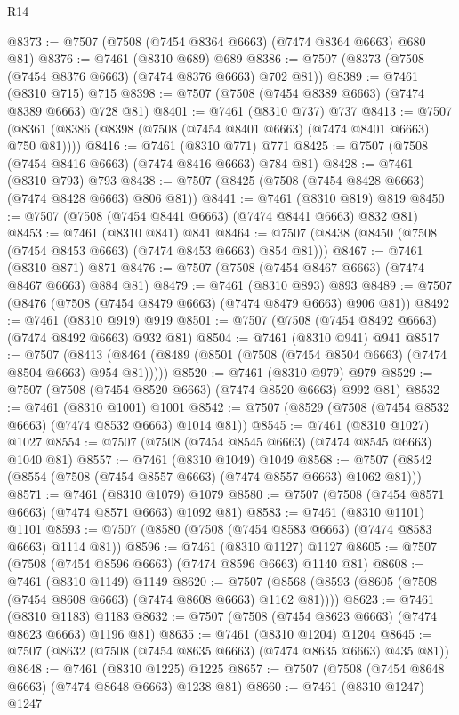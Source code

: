 \begin{lexlean}{R14}
\begin{coremodule}
@8373 := @7507 (@7508 (@7454 @8364 @6663) (@7474 @8364 @6663) @680 @81)
@8376 := @7461 (@8310 @689) @689
@8386 := @7507 (@8373 (@7508 (@7454 @8376 @6663) (@7474 @8376 @6663) @702 @81))
@8389 := @7461 (@8310 @715) @715
@8398 := @7507 (@7508 (@7454 @8389 @6663) (@7474 @8389 @6663) @728 @81)
@8401 := @7461 (@8310 @737) @737
@8413 := @7507 (@8361 (@8386 (@8398 (@7508 (@7454 @8401 @6663) (@7474 @8401 @6663) @750 @81))))
@8416 := @7461 (@8310 @771) @771
@8425 := @7507 (@7508 (@7454 @8416 @6663) (@7474 @8416 @6663) @784 @81)
@8428 := @7461 (@8310 @793) @793
@8438 := @7507 (@8425 (@7508 (@7454 @8428 @6663) (@7474 @8428 @6663) @806 @81))
@8441 := @7461 (@8310 @819) @819
@8450 := @7507 (@7508 (@7454 @8441 @6663) (@7474 @8441 @6663) @832 @81)
@8453 := @7461 (@8310 @841) @841
@8464 := @7507 (@8438 (@8450 (@7508 (@7454 @8453 @6663) (@7474 @8453 @6663) @854 @81)))
@8467 := @7461 (@8310 @871) @871
@8476 := @7507 (@7508 (@7454 @8467 @6663) (@7474 @8467 @6663) @884 @81)
@8479 := @7461 (@8310 @893) @893
@8489 := @7507 (@8476 (@7508 (@7454 @8479 @6663) (@7474 @8479 @6663) @906 @81))
@8492 := @7461 (@8310 @919) @919
@8501 := @7507 (@7508 (@7454 @8492 @6663) (@7474 @8492 @6663) @932 @81)
@8504 := @7461 (@8310 @941) @941
@8517 := @7507
    (@8413 (@8464 (@8489 (@8501 (@7508 (@7454 @8504 @6663) (@7474 @8504 @6663) @954 @81)))))
@8520 := @7461 (@8310 @979) @979
@8529 := @7507 (@7508 (@7454 @8520 @6663) (@7474 @8520 @6663) @992 @81)
@8532 := @7461 (@8310 @1001) @1001
@8542 := @7507 (@8529 (@7508 (@7454 @8532 @6663) (@7474 @8532 @6663) @1014 @81))
@8545 := @7461 (@8310 @1027) @1027
@8554 := @7507 (@7508 (@7454 @8545 @6663) (@7474 @8545 @6663) @1040 @81)
@8557 := @7461 (@8310 @1049) @1049
@8568 := @7507 (@8542 (@8554 (@7508 (@7454 @8557 @6663) (@7474 @8557 @6663) @1062 @81)))
@8571 := @7461 (@8310 @1079) @1079
@8580 := @7507 (@7508 (@7454 @8571 @6663) (@7474 @8571 @6663) @1092 @81)
@8583 := @7461 (@8310 @1101) @1101
@8593 := @7507 (@8580 (@7508 (@7454 @8583 @6663) (@7474 @8583 @6663) @1114 @81))
@8596 := @7461 (@8310 @1127) @1127
@8605 := @7507 (@7508 (@7454 @8596 @6663) (@7474 @8596 @6663) @1140 @81)
@8608 := @7461 (@8310 @1149) @1149
@8620 := @7507 (@8568 (@8593 (@8605 (@7508 (@7454 @8608 @6663) (@7474 @8608 @6663) @1162 @81))))
@8623 := @7461 (@8310 @1183) @1183
@8632 := @7507 (@7508 (@7454 @8623 @6663) (@7474 @8623 @6663) @1196 @81)
@8635 := @7461 (@8310 @1204) @1204
@8645 := @7507 (@8632 (@7508 (@7454 @8635 @6663) (@7474 @8635 @6663) @435 @81))
@8648 := @7461 (@8310 @1225) @1225
@8657 := @7507 (@7508 (@7454 @8648 @6663) (@7474 @8648 @6663) @1238 @81)
@8660 := @7461 (@8310 @1247) @1247

\end{coremodule}
\end{lexlean}
